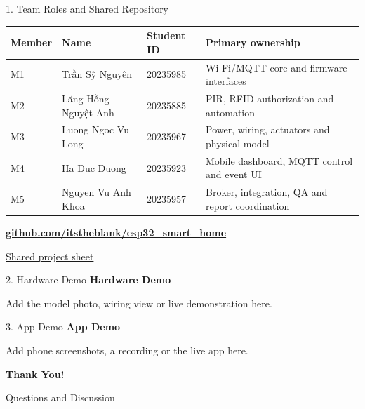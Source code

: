 \documentclass[aspectratio=169,11pt]{beamer}
\newcommand{\VNname}[1]{{\fontencoding{T5}\selectfont #1}}
\newcommand{\SheetLink}{https://docs.google.com/spreadsheets/d/1aQGHk3CCcypYjSrMD-Z9yHB_KMrWZ5OGlXp1mt-CLV8/edit}
\newcommand{\RepoLink}{https://github.com/itstheblank/esp32_smart_home}
\begin{document}
\begin{frame}{1. Team Roles and Shared Repository}
  \small
  \begin{tabularx}{\textwidth}{@{}l >{\raggedright\arraybackslash}p{3.9cm} l >{\raggedright\arraybackslash}X@{}}
    \toprule
    \textbf{Member} & \textbf{Name} & \textbf{Student ID} & \textbf{Primary ownership} \\
    \midrule
    M1 & \VNname{Trần Sỹ Nguyên} & 20235985 & Wi-Fi/MQTT core and firmware interfaces \\
    M2 & \VNname{Lăng Hồng Nguyệt Anh} & 20235885 & PIR, RFID authorization and automation \\
    M3 & Luong Ngoc Vu Long & 20235967 & Power, wiring, actuators and physical model \\
    M4 & Ha Duc Duong & 20235923 & Mobile dashboard, MQTT control and event UI \\
    M5 & Nguyen Vu Anh Khoa & 20235957 & Broker, integration, QA and report coordination \\
    \bottomrule
  \end{tabularx}
  \vspace{0.35cm}
  \href{\RepoLink}{\textbf{github.com/itstheblank/esp32\_smart\_home}}\par
  \href{\SheetLink}{Shared project sheet}\par
\end{frame}

\begin{frame}{2. Hardware Demo}
  \centering
  \vfill
  {\Large\color{DeepBlue}\bfseries Hardware Demo}\par
  \vspace{0.4cm}
  {\normalsize Add the model photo, wiring view or live demonstration here.}
  \vfill
\end{frame}

\begin{frame}{3. App Demo}
  \centering
  \vfill
  {\Large\color{DeepBlue}\bfseries App Demo}\par
  \vspace{0.4cm}
  {\normalsize Add phone screenshots, a recording or the live app here.}
  \vfill
\end{frame}

\begin{frame}[plain]
  \centering
  \vfill
  {\Huge\bfseries\color{DeepBlue} Thank You!}\par
  \vspace{0.4cm}
  {\large Questions and Discussion}
  \vfill
\end{frame}
\end{document}
